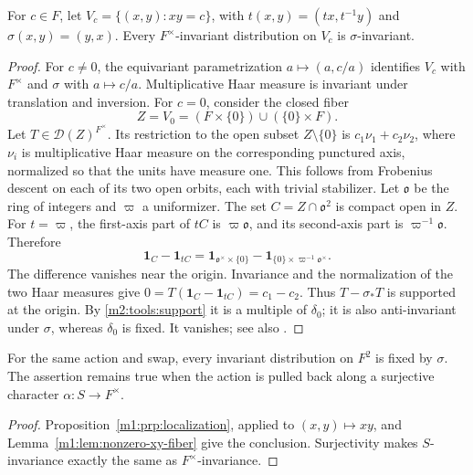\begin{lemma}
\label{m1:lem:nonzero-xy-fiber}\label{m1:lem:Prasad-two-axis}\label{m1:subsec:two-axis}
For $c\in F$, let $V_c=\{(x,y):xy=c\}$, with
$t(x,y)=(tx,t^{-1}y)$ and $\sigma(x,y)=(y,x)$. Every
$F^\times$-invariant distribution on $V_c$ is $\sigma$-invariant.
\end{lemma}
\begin{proof}
For $c\neq0$, the equivariant parametrization
$a\mapsto(a,c/a)$ identifies $V_c$ with $F^\times$ and $\sigma$ with
$a\mapsto c/a$. Multiplicative Haar measure is invariant under translation
and inversion. For $c=0$, consider the closed fiber
\[
 Z=V_0=(F\times\{0\})\cup(\{0\}\times F).
\]
Let $T\in\mathcal D(Z)^{F^\times}$. Its restriction to the open
subset $Z\setminus\{0\}$ is
$c_1\nu_1+c_2\nu_2$, where $\nu_i$ is multiplicative Haar
measure on the corresponding punctured axis, normalized so that
the units have measure one. This follows from Frobenius descent
on each of its two open orbits, each with trivial stabilizer.
Let $\mathfrak o$ be the ring of integers and $\varpi$ a
uniformizer. The set $C=Z\cap\mathfrak o^2$ is compact open
in $Z$. For $t=\varpi$, the first-axis part of $tC$ is
$\varpi\mathfrak o$, and its second-axis part is
$\varpi^{-1}\mathfrak o$. Therefore
\[
 \mathbf1_C-\mathbf1_{tC}
 =\mathbf1_{\mathfrak o^\times\times\{0\}}
  -\mathbf1_{\{0\}\times\varpi^{-1}\mathfrak o^\times}.
\]
The difference vanishes near the origin. Invariance and the
normalization of the two Haar measures give
$0=T(\mathbf1_C-\mathbf1_{tC})=c_1-c_2$.
Thus $T-\sigma_*T$ is supported at the origin. By
\cref{m2:tools:support} it is a multiple of $\delta_0$; it is also
anti-invariant under $\sigma$, whereas $\delta_0$ is fixed.
It vanishes; see also \cite[Lemma~4.6]{Prasad90}.

\end{proof}

\begin{proposition}
\label{m1:prop:opposite-weight-plane}\label{m2:elem:split}\label{m1:cor:opposite-weight-character}
For the same action and swap, every invariant distribution on $F^2$ is
fixed by $\sigma$. The assertion remains true when the action is pulled
back along a surjective character $\alpha:S\to F^\times$.
\end{proposition}
\begin{proof}
Proposition~\ref{m1:prp:localization}, applied to $(x,y)\mapsto xy$,
and Lemma~\ref{m1:lem:nonzero-xy-fiber} give the conclusion. Surjectivity makes $S$-invariance exactly
the same as $F^\times$-invariance.
\end{proof}

